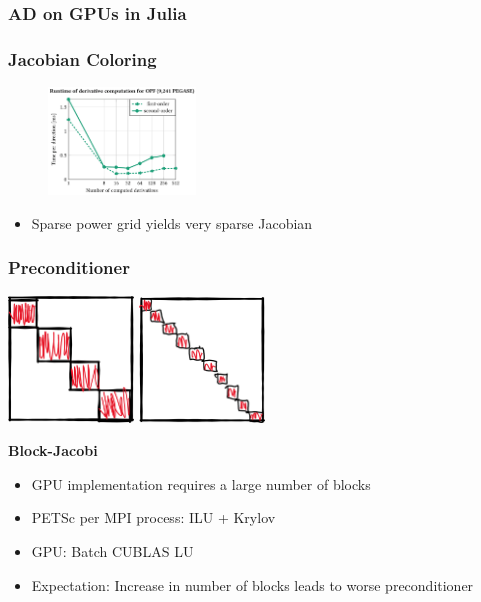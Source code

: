 \begin{frame}
  \frametitle{AD on GPUs in Julia}
\end{frame}

\begin{frame}
  \frametitle{Jacobian Coloring}
  \begin{center}
    \begin{figure}
      \includegraphics[width=0.35\textwidth]{figures/directionsgpu}
    \end{figure}
  \end{center}
  \begin{itemize}
    \item Sparse power grid yields very sparse Jacobian
  \end{itemize}
\end{frame}

\begin{frame}
  \frametitle{Preconditioner}
  \begin{center}
    \includegraphics[width=0.25\textwidth]{figures/mpiblocks}
    \includegraphics[width=0.25\textwidth]{figures/gpublocks}
  \end{center}
  {\bf Block-Jacobi}
  \begin{itemize}
    \item GPU implementation requires a large number of blocks
    \item PETSc per MPI process: ILU + Krylov 
    \item GPU: Batch CUBLAS LU
    \item Expectation: Increase in number of blocks leads to worse preconditioner
  \end{itemize}
\end{frame}

